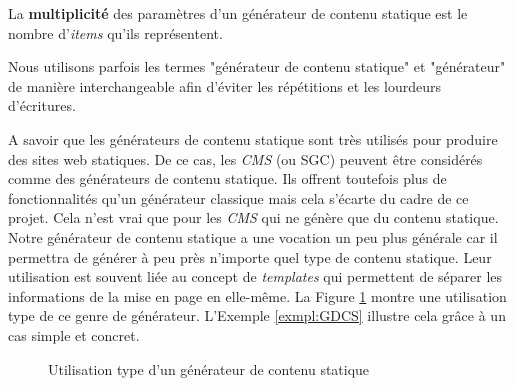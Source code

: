 		\begin{defn}
			 La \textbf{multiplicité} des paramètres d'un générateur de contenu statique est le nombre d'\textit{items} qu'ils représentent.
		\end{defn}
		
		\begin{note}
			Nous utilisons parfois les termes "générateur de contenu statique" et "générateur" de manière interchangeable afin d'éviter les répétitions et les lourdeurs d'écritures.
		\end{note}
		
		 A savoir que les générateurs de contenu statique sont très utilisés pour produire des sites web statiques. De ce cas, les \textit{CMS} (ou SGC) peuvent être considérés comme des générateurs de contenu statique. Ils offrent toutefois plus de fonctionnalités qu'un générateur classique mais cela s'écarte du cadre de ce projet. Cela n'est vrai que pour les \textit{CMS} qui ne génère que du contenu statique.\\
		 
		 Notre générateur de contenu statique a une vocation un peu plus générale car il permettra de générer à peu près n'importe quel type de contenu statique. Leur utilisation est souvent liée au concept de \textit{templates} qui permettent de séparer les informations de la mise en page en elle-même. La Figure \ref{fig:use_of_generator} montre une utilisation type de ce genre de générateur. L'Exemple \ref{exmpl:GDCS} illustre cela grâce à un cas simple et concret.\\
		
		\begin{figure}[h]
			\begin{center}
			\caption{Utilisation type d'un générateur de contenu statique}
			\label{fig:use_of_generator}
			\end{center}
		\end{figure}
		
